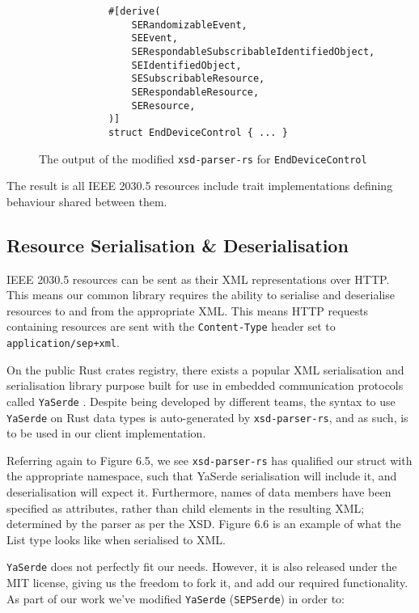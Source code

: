 \begin{figure}[H]
    \begin{center}
        \begin{lstlisting}
            #[derive(
                SERandomizableEvent,
                SEEvent,
                SERespondableSubscribableIdentifiedObject,
                SEIdentifiedObject,
                SESubscribableResource,
                SERespondableResource,
                SEResource,
            )]
            struct EndDeviceControl { ... }
        \end{lstlisting}
        \label{fig:edctraits}
        \caption{The output of the modified \texttt{xsd-parser-rs} for \texttt{EndDeviceControl}}
    \end{center}
\end{figure}

The result is all IEEE 2030.5 resources include trait implementations defining behaviour shared between them. 

\subsection{Resource Serialisation \& Deserialisation}
IEEE 2030.5 resources can be sent as their XML representations over HTTP. This means our common library requires the ability to serialise and deserialise resources to and from the appropriate XML.
This means HTTP requests containing resources are sent with the \texttt{Content-Type} header set to \texttt{application/sep+xml}.

On the public Rust crates registry, there exists a popular XML serialisation and serialisation library purpose built for use in embedded communication protocols called \texttt{YaSerde} \cite[]{YaSerde}.
Despite being developed by different teams, the syntax to use \texttt{YaSerde} on Rust data types is auto-generated by \texttt{xsd-parser-rs}, and as such, is to be used in our client implementation.

Referring again to Figure 6.5, we see \texttt{xsd-parser-rs} has qualified our struct with the appropriate namespace, such that YaSerde serialisation will include it, and deserialisation will expect it.
Furthermore, names of data members have been specified as attributes, rather than child elements in the resulting XML; determined by the parser as per the XSD.
Figure 6.6 is an example of what the List type looks like when serialised to XML.

\texttt{YaSerde} does not perfectly fit our needs. However, it is also released under the MIT license, giving us the freedom to fork it, and add our required functionality.
As part of our work we've modified \texttt{YaSerde} (\texttt{SEPSerde}) in order to:

